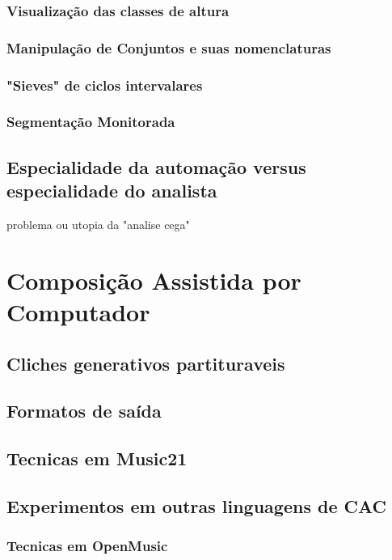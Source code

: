 \documentclass[
	12pt,				%
	openright,			%
	twoside,			%
	a4paper,			%
	english,			%
	french,				%
	spanish,			%
	brazil				%
	]{abntex2}
\begin{document}
\subsection{Visualização das classes de altura}

\subsection{Manipulação de Conjuntos e suas nomenclaturas}

\subsection{"Sieves" de ciclos intervalares}

\subsection{Segmentação Monitorada}


\section{Especialidade da automação versus especialidade do analista}

problema ou utopia da "analise cega"


\chapter{Composição Assistida por Computador}

\section{Cliches generativos partituraveis}



\section{Formatos de saída}

\section{Tecnicas em Music21}

\section{Experimentos em outras linguagens de CAC}

\subsection{Tecnicas em OpenMusic}
\end{document}
